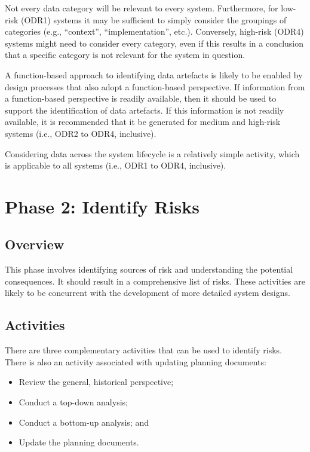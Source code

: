 Not every data category will be relevant to every system. Furthermore, for low-risk (ODR1) systems it may be sufficient to simply consider the groupings of categories (e.g., ``context'', ``implementation'', etc.). Conversely, high-risk (ODR4) systems might need to consider every category, even if this results in a conclusion that a specific category is not relevant for the system in question.

A function-based approach to identifying \glspl{data artefact} is likely to be enabled by design processes that also adopt a function-based perspective. If \gls{information} from a function-based perspective is readily available, then it should be used to support the identification of \glspl{data artefact}. If this \gls{information} is not readily available, it is recommended that it be generated for medium and high-risk systems (i.e., ODR2 to ODR4, inclusive).

Considering data across the system lifecycle is a relatively simple activity, which is applicable to all systems (i.e., ODR1 to ODR4, inclusive).

\clearpage
\section{Phase 2: Identify Risks}\label{bkm:identifyrisks}
\subsection{Overview}
This phase involves identifying sources of risk and understanding the potential consequences. It should result in a comprehensive list of risks. These activities are likely to be concurrent with the development of more detailed system designs.

\subsection{Activities}
There are three complementary activities that can be used to identify risks. There is also an activity associated with updating planning documents:
\begin{itemize}
	\item Review the general, historical perspective;
	\item Conduct a top-down analysis;
	\item Conduct a bottom-up analysis; and
	\item Update the planning documents.
\end{itemize}

